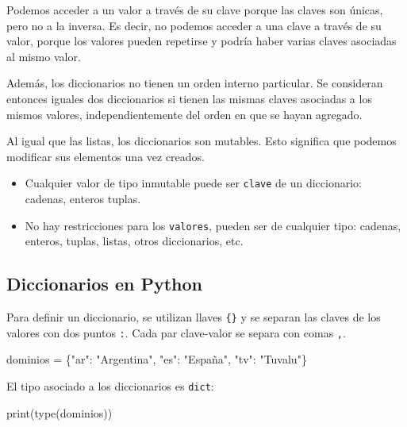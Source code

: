 \documentclass[
  letterpaper,
  DIV=11,
  numbers=noendperiod]{scrreprt}
\newenvironment{Shaded}{\begin{snugshade}}{\end{snugshade}}
\newcommand{\BuiltInTok}[1]{\textcolor[rgb]{0.00,0.23,0.31}{#1}}
\newcommand{\NormalTok}[1]{\textcolor[rgb]{0.00,0.23,0.31}{#1}}
\newcommand{\OperatorTok}[1]{\textcolor[rgb]{0.37,0.37,0.37}{#1}}
\newcommand{\StringTok}[1]{\textcolor[rgb]{0.13,0.47,0.30}{#1}}
\providecommand{\tightlist}{%
  \setlength{\itemsep}{0pt}\setlength{\parskip}{0pt}}\usepackage{longtable,booktabs,array}
\begin{document}
Podemos acceder a un valor a través de su clave porque las claves son
únicas, pero no a la inversa. Es decir, no podemos acceder a una clave a
través de su valor, porque los valores pueden repetirse y podría haber
varias claves asociadas al mismo valor.

Además, los diccionarios no tienen un orden interno particular. Se
consideran entonces iguales dos diccionarios si tienen las mismas claves
asociadas a los mismos valores, independientemente del orden en que se
hayan agregado.

Al igual que las listas, los diccionarios son mutables. Esto significa
que podemos modificar sus elementos una vez creados.

\begin{itemize}
\tightlist
\item
  Cualquier valor de tipo inmutable puede ser \texttt{clave} de un
  diccionario: cadenas, enteros tuplas.
\item
  No hay restricciones para los \texttt{valores}, pueden ser de
  cualquier tipo: cadenas, enteros, tuplas, listas, otros diccionarios,
  etc.
\end{itemize}

\subsection{Diccionarios en Python}\label{diccionarios-en-python}

Para definir un diccionario, se utilizan llaves \texttt{\{\}} y se
separan las claves de los valores con dos puntos \texttt{:}. Cada par
clave-valor se separa con comas \texttt{,}.

\begin{Shaded}
\begin{Highlighting}[]
\NormalTok{dominios }\OperatorTok{=}\NormalTok{ \{}\StringTok{"ar"}\NormalTok{: }\StringTok{"Argentina"}\NormalTok{, }\StringTok{"es"}\NormalTok{: }\StringTok{"España"}\NormalTok{, }\StringTok{"tv"}\NormalTok{: }\StringTok{"Tuvalu"}\NormalTok{\}}
\end{Highlighting}
\end{Shaded}

El tipo asociado a los diccionarios es \texttt{dict}:

\begin{Shaded}
\begin{Highlighting}[]
\BuiltInTok{print}\NormalTok{(}\BuiltInTok{type}\NormalTok{(dominios))}
\end{Highlighting}
\end{Shaded}
\end{document}
